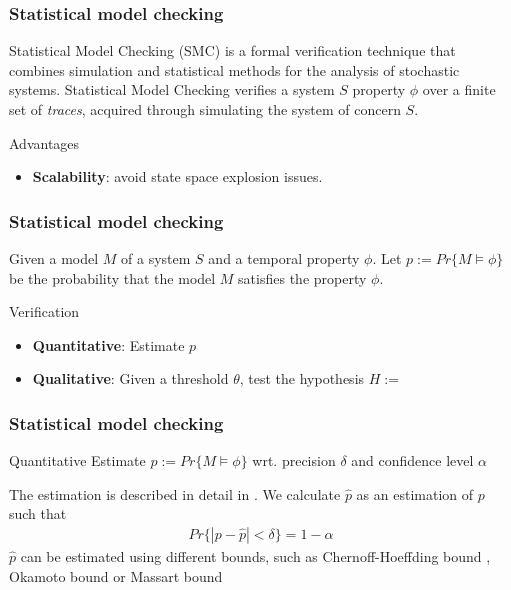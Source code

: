 \documentclass{beamer}
\begin{document}
\begin{frame}
    \frametitle{Statistical model checking}
    Statistical Model Checking (SMC) is a formal verification technique that combines simulation and statistical methods for the analysis of stochastic systems. \footnotemark[1] Statistical Model Checking verifies a system $S$ property $\phi$ over a finite set of \textit{traces}, acquired through simulating the system of concern $S$.
    \begin{block}{Advantages}
        \begin{itemize}
            \item \textbf{Scalability}: avoid state space explosion issues.
        \end{itemize}
    \end{block}
\end{frame}


\begin{frame}
    \frametitle{Statistical model checking}
    Given a model $M$ of a system $S$ and a temporal property $\phi$. Let $p:=Pr\{M \models \phi \}$ be the probability that the model $M$ satisfies the property $\phi$. \footnotemark[1]
    \begin{block}{Verification}
        \begin{itemize}
            \item \textbf{Quantitative}: Estimate $p$
            \item \textbf{Qualitative}: Given a threshold $\theta$, test the hypothesis $H := $
        \end{itemize}
    \end{block}
\end{frame}

\begin{frame}
    \frametitle{Statistical model checking}
    \begin{block}{Quantitative}
        Estimate $p:=Pr\{M \models \phi \}$ wrt. precision $\delta$ and confidence level $\alpha$
    \end{block}
    The estimation is described in detail in \cite{agha2018survey}. We calculate $\hat{p}$ as an estimation of $p$ such that
    \begin{align*}
        Pr\{ |p - \hat{p}| < \delta \} = 1 - \alpha
    \end{align*}
    $\hat{p}$ can be estimated using different bounds, such as Chernoff-Hoeffding bound \cite{hoeffding1963probability}, Okamoto bound \cite{okamoto1959some} or Massart bound \cite{massart1990tight}
\end{frame}
\end{document}
